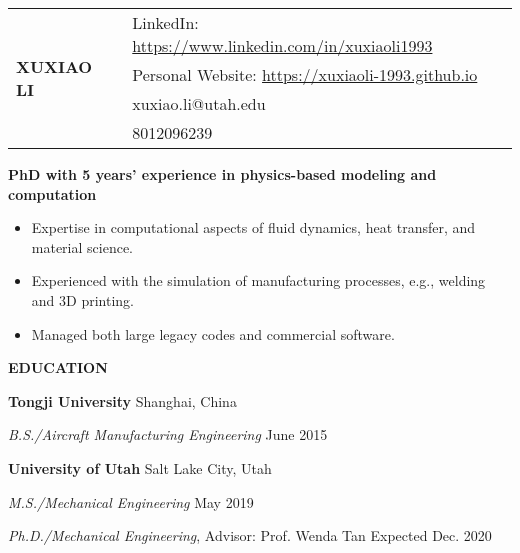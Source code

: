 \documentclass[11pt, letterpaper]{article}
\begin{document}
\begin{tabular}{@{} p{} p{} @{}}
   \multirow{4}{*}{{\textbf{\huge XUXIAO LI}}} & LinkedIn:
    \href{https://www.linkedin.com/in/xuxiaoli1993}{https://www.linkedin.com/in/xuxiaoli1993} \\
     & Personal Website: \href{https://xuxiaoli-1993.github.io}{https://xuxiaoli-1993.github.io} \\
     & xuxiao.li@utah.edu \\
     & 8012096239
\end{tabular}

% 
% 
% 

\vspace{24pt}

\textbf{PhD with 5 years' experience in physics-based modeling and computation}
\begin{itemize}[leftmargin=*, labelsep=5mm]
   \item Expertise in computational aspects of fluid dynamics, heat transfer, and material science.
   \item Experienced with the simulation of manufacturing processes, e.g., welding and 3D printing.
   \item Managed both large legacy codes and commercial software.
\end{itemize}

\vspace{12pt}

\textbf{EDUCATION}

\fullrule

\textbf{Tongji University} 
\hfill
Shanghai, China

\textit{B.S./Aircraft Manufacturing Engineering} \hfill June 2015

\vspace{6pt}
\textbf{University of Utah} \hfill Salt Lake City, Utah

\textit{M.S./Mechanical Engineering} \hfill May 2019

\textit{Ph.D./Mechanical Engineering}, Advisor: Prof. Wenda Tan \hfill Expected Dec. 2020 
\vskip 6pt
\end{document}
